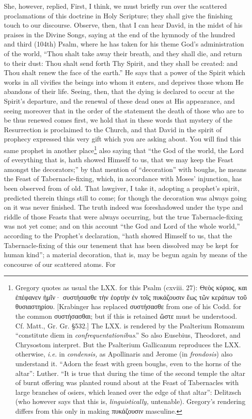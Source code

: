 She, however, replied, First, I think, we must briefly run over the scattered proclamations of this doctrine in Holy Scripture; they shall give the finishing touch to our discourse. Observe, then, that I can hear David, in the midst of his praises in the Divine Songs, saying at the end of the hymnody of the hundred and third (104th) Psalm, where he has taken for his theme God’s administration of the world, “Thou shalt take away their breath, and they shall die, and return to their dust: Thou shalt send forth Thy Spirit, and they shall be created: and Thou shalt renew the face of the earth.” He says that a power of the Spirit which works in all vivifies the beings into whom it enters, and deprives those whom He abandons of their life. Seeing, then, that the dying is declared to occur at the Spirit’s departure, and the renewal of these dead ones at His appearance, and seeing moreover that in the order of the statement the death of those who are to be thus renewed comes first, we hold that in these words that mystery of the Resurrection is proclaimed to the Church, and that David in the spirit of prophecy expressed this very gift which you are asking about. You will find this same prophet in another place\footnote{Gregory quotes as usual the LXX. for this Psalm (cxviii. 27): \textgreek{Θεὸς κύριος, και ἐπέφανεν ἡμῖν· συστήσασθε τὴν ἐορτὴν ἐν τοῖς πυκάζουσιν ἕως τῶν κεράτων τοῦ θυσιαστηρίου}. [Krabinger has replaced \textgreek{συστήσασθε} from one of his Codd. for the common \textgreek{συστήσασθαι}; but if this is retained \textgreek{ὥστε} must be understood. Cf. Matt., Gr. Gr. §532.] The LXX. is rendered by the Psalterium Romanum “constitute diem in \emph{confrequentationibus}.” So also Eusebius, Theodoret, and Chrysostom interpret. But the Psalterium Gallicanum reproduces the LXX. otherwise, \emph{i.e.} in \emph{condensis,} as Apollinaris and Jerome (in \emph{frondosis}) also understand it. “Adorn the feast with green boughs, even to the horns of the altar”: Luther. “It is true that during the time of the second temple the altar of burnt offering was planted round about at the Feast of Tabernacles with large branches of osiers, which leaned over the edge of that altar”: Delitzsch (who however says that this is, \emph{linguistically,} untenable). Gregory’s rendering differs from this only in making \textgreek{πυκάζουσιν} masculine.} also saying that “the God of the world, the Lord of everything that is, hath showed Himself to us, that we may keep the Feast amongst the decorators;” by that mention of “decoration” with boughs, he means the Feast of Tabernacle-fixing, which, in accordance with Moses’ injunction, has been observed from of old. That lawgiver, I take it, adopting a prophet’s spirit, predicted therein things still to come; for though the decoration was always going on it was never finished. The truth indeed was foreshadowed under the type and riddle of those Feasts that were always occurring, but the true Tabernacle-fixing was not yet come; and on this account “the God and Lord of the whole world,” according to the Prophet’s declaration, “hath showed Himself to us, that the Tabernacle-fixing of this our tenement that has been dissolved may be kept for human kind”; a material decoration, that is, may be begun again by means of the concourse of our scattered atoms. For 